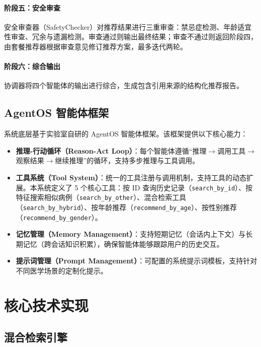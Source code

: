 \documentclass[12pt,a4paper]{article}
\begin{document}
\paragraph{阶段五：安全审查}
安全审查器（SafetyChecker）对推荐结果进行三重审查：禁忌症检测、年龄适宜性审查、冗余与遗漏检测。审查通过则输出最终结果；审查不通过则返回阶段四，由套餐推荐器根据审查意见修订推荐方案，最多迭代两轮。

\paragraph{阶段六：综合输出}
协调器将四个智能体的输出进行综合，生成包含引用来源的结构化推荐报告。

\subsection{AgentOS 智能体框架}

系统底层基于实验室自研的 AgentOS 智能体框架。该框架提供以下核心能力：

\begin{itemize}[leftmargin=2em]
    \item \textbf{推理-行动循环（Reason-Act Loop）}：每个智能体遵循“推理$\to$调用工具$\to$观察结果$\to$继续推理”的循环，支持多步推理与工具调用。
    \item \textbf{工具系统（Tool System）}：统一的工具注册与调用机制，支持工具的动态扩展。本系统定义了 5 个核心工具：按 ID 查询历史记录（\texttt{search\_by\_id}）、按特征搜索相似病例（\texttt{search\_by\_other}）、混合检索工具（\texttt{search\_by\_hybrid}）、按年龄推荐（\texttt{recommend\_by\_age}）、按性别推荐（\texttt{recommend\_by\_gender}）。
    \item \textbf{记忆管理（Memory Management）}：支持短期记忆（会话内上下文）与长期记忆（跨会话知识积累），确保智能体能够跟踪用户的历史交互。
    \item \textbf{提示词管理（Prompt Management）}：可配置的系统提示词模板，支持针对不同医学场景的定制化提示。
\end{itemize}

\section{核心技术实现}
\label{sec:implementation}

\subsection{混合检索引擎}
\end{document}

